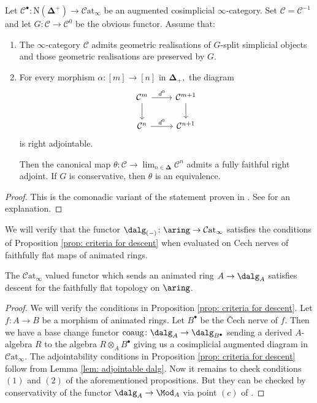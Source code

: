 \documentclass[10pt,reqno]{amsart}
\numberwithin{equation}{section}
\newcommand{\cC}{\mathcal{C}}
\newcommand{\catinf}{\mathcal{C}\mathrm{at}_\infty}
\begin{document}
\begin{proposition}\label{prop: criteria for descent}
    Let $\cC^\bullet\colon \mathrm{N}(\mathbf{\Delta^+})\to \cC\mathrm{at}_\infty$ be an augmented cosimplicial $\infty$-category. Set $\cC=\cC^{-1}$ and let $G\colon \cC\to \cC^{0}$ be the obvious functor. Assume that:
    \begin{enumerate}
        \item The $\infty$-category $\cC$ admits geometric realisations of $G$-split simplicial objects and those geometric realisations are preserved by $G$.
        \item For every morphism $\alpha\colon [m]\to [n]$ in $\mathbf{\Delta}_+,$ the diagram $$
\begin{tikzcd}
\cC^m \arrow[d] \arrow[r, "d^0"] & \cC^{m+1} \arrow[d] \\
\cC^n \arrow[r, "d^0"]           & \cC^{n+1}          
\end{tikzcd}$$
        is right adjointable.

        Then the canonical map $\theta\colon \cC\to \lim_{n\in \mathbf{\Delta}} \cC^n$ admits a fully faithful right adjoint. If $G$ is conservative, then $\theta$ is an equivalence.
    \end{enumerate}
\end{proposition}
\begin{proof}
    This is the comonadic variant of the statement proven in \cite[Corollary 4.7.5.3]{HA}. See \cite[Corollary 4.8]{Moulinos2021GeometryOfFiltrations} for an explanation. 
\end{proof}



We will verify that the functor $\dalg_{(-)}\colon \aring\to \catinf$ satisfies the conditions of Proposition \ref{prop: criteria for descent} when evaluated on Cech nerves of faithfully flat maps of animated rings.
 
\begin{theorem}\label{flat descent}
    The  $\catinf$ valued functor which sends an animated ring $A\to \dalg_A$ satisfies descent for the faithfully flat topology on $\aring$.
\end{theorem}

\begin{proof}
We will verify the conditions in Proposition \ref{prop: criteria for descent}. Let $f\colon A\to B$ be a morphism of animated rings. Let $B^\bullet$ be the \v{C}ech nerve of $f$. Then we have a base change functor $\mathrm{coaug}\colon \dalg_A\to \dalg_{B^\bullet}$ sending a derived $A$-algebra $R$ to the algebra $R\otimes_A B^\bullet$ giving us a cosimplicial augmented diagram in $\catinf$. The adjointability conditions in Proposition \ref{prop: criteria for descent} follow from Lemma \ref{lem: adjointable dalg}. Now it remains to check conditions $(1)$ and $(2)$ of the aforementioned propositions. But they can be checked by conservativity of the functor $\dalg_A\to \Mod_A$ via point $(c)$ of \cite[Notation 4.2.28]{Rak20}.

\end{proof}
\end{document}
